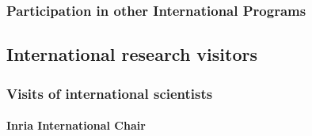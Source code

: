 \subsubsection{Participation in other International Programs}





    \subsection{International research visitors}

\subsubsection{Visits of international scientists}

\paragraph{Inria International Chair}




